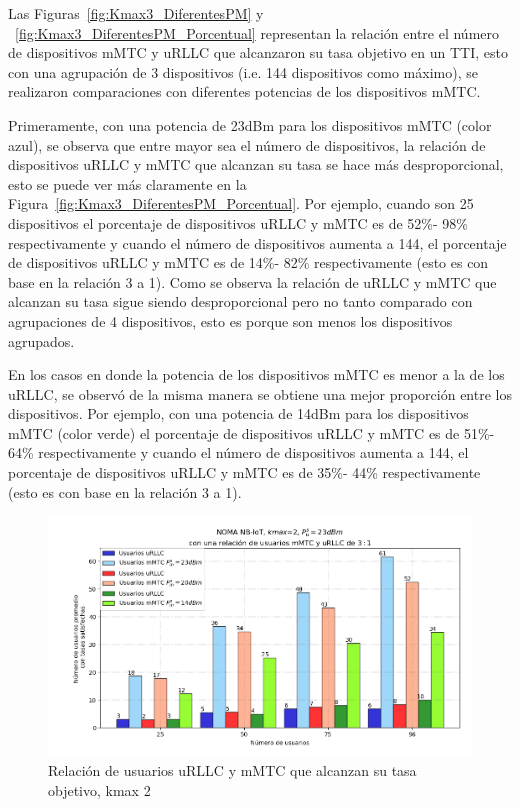 Las Figuras~\ref{fig:Kmax3_DiferentesPM} y ~\ref{fig:Kmax3_DiferentesPM_Porcentual} representan la relación entre el número de dispositivos mMTC y uRLLC que alcanzaron su tasa objetivo en un TTI, esto con una agrupación de 3 dispositivos (i.e. 144 dispositivos como máximo), se realizaron comparaciones con diferentes potencias de los dispositivos mMTC.

Primeramente, con una potencia de 23dBm para los dispositivos mMTC (color azul), se observa que entre mayor sea el número de dispositivos, la relación de dispositivos uRLLC y mMTC que alcanzan su tasa se hace más desproporcional, esto se puede ver más claramente en la Figura~\ref{fig:Kmax3_DiferentesPM_Porcentual}. Por ejemplo, cuando son 25 dispositivos el porcentaje de dispositivos uRLLC y mMTC es de 52\%- 98\% respectivamente y cuando el número de dispositivos aumenta a 144, el porcentaje de dispositivos uRLLC y mMTC es de 14\%- 82\% respectivamente (esto es con base en la relación 3 a 1). Como se observa la relación de uRLLC y mMTC que alcanzan su tasa sigue siendo desproporcional pero no tanto comparado con agrupaciones de 4 dispositivos, esto es porque son menos los dispositivos agrupados.\newline

En los casos en donde la potencia de los dispositivos mMTC es menor a la de los uRLLC, se observó de la misma manera se obtiene una mejor proporción entre los dispositivos. Por ejemplo, con una potencia de 14dBm para los dispositivos mMTC (color verde) el porcentaje de dispositivos uRLLC y mMTC es de 51\%- 64\% respectivamente y cuando el número de dispositivos aumenta a 144, el porcentaje de dispositivos uRLLC y mMTC es de 35\%- 44\% respectivamente (esto es con base en la relación 3 a 1). \newline

\break

\begin{figure}[th]
    \centering
    \includegraphics[scale=.6]{Figures/ResultadosNOMA/Kmax2_DiferentesPM.png}
    \decoRule
    \caption[Relación de usuarios uRLLC y mMTC que alcanzan su tasa objetivo, kmax 2]{Relación de usuarios uRLLC y mMTC que alcanzan su tasa objetivo, kmax 2}
    \label{fig:Kmax2_DiferentesPM}
\end{figure}


